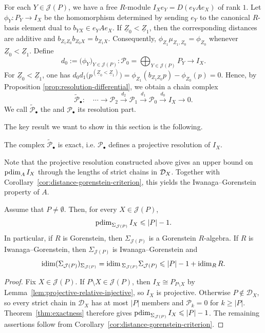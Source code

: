 \documentclass[a4paper,leqno]{amsart}
\begin{document}
For each $Y\in\mathcal J(P)$, we have a free $R$-module $I_Xe_Y=D(e_YAe_X)$ of rank $1$.  Let $\phi_Y\colon P_Y\to I_X$ be the homomorphism determined by sending $e_Y$ to the canonical $R$-basis element dual to $b_{YX}\in e_YAe_X$. If $\underline{Z}_0<\underline{Z}_1$, then the corresponding distances are additive and $b_{Z_1Z_0}b_{Z_0X}=b_{Z_1X}$.  Consequently, $\phi_{Z_1}\mu_{Z_1,Z_0}=\phi_{Z_0}$ whenever $\underline{Z}_0<\underline{Z}_1$. Define
\[
 d_0:=\bigl(\phi_Y\bigr)_{Y\in\mathcal J(P)}\colon\mathcal P_0=\bigoplus_{Y\in\mathcal J(P)}P_Y\longrightarrow I_X.
\]
For \(\underline{Z}_0<\underline{Z}_1\), one has $d_0d_1\bigl(p^{(\underline{Z}_0<\underline{Z}_1)}\bigr)=\phi_{Z_1}(b_{Z_1Z_0}p)-\phi_{Z_0}(p)=0$. Hence, by Proposition \ref{prop:resolution-differential}, we obtain a chain complex
\begin{equation}
 \widetilde{\mathcal{P}}_\bullet: \quad \cdots\longrightarrow\mathcal P_2\xrightarrow{d_2}\mathcal P_1\xrightarrow{d_1}\mathcal P_0\xrightarrow{d_0}I_X\longrightarrow0.
 \label{eq:candidate-complex}
\end{equation}
We call $\widetilde{\mathcal P}_\bullet$ the  and $\mathcal{P}_\bullet$ its resolution part.

The key result we want to show in this section is the following.
\begin{thm}\label{thm:exactness}
The complex $\widetilde{\mathcal{P}}_\bullet$ is exact, i.e. $\mathcal{P}_\bullet$ defines a projective resolution of $I_X$.
\end{thm}

Note that the projective resolution constructed above gives an upper bound on $\operatorname{pdim}_A I_X$ through the lengths of strict chains in $\mathcal D_X$. Together with Corollary~\ref{cor:distance-gorenstein-criterion}, this yields the Iwanaga--Gorenstein property of $A$.

\begin{cor}\label{cor:distributive-ig}
Assume that $P\neq\emptyset$. Then, for every $X\in\mathcal J(P)$,
\[
\operatorname{pdim}_{\Sigma_{\mathcal J(P)}}I_X\leqslant |P|-1.
\]
In particular, if $R$ is Gorenstein, then $\Sigma_{\mathcal J(P)}$ is a Gorenstein $R$-algebra. If $R$ is Iwanaga--Gorenstein, then $\Sigma_{\mathcal J(P)}$ is Iwanaga--Gorenstein and
\[
\operatorname{idim}(\Sigma_{\mathcal J(P)})_{\Sigma_{\mathcal J(P)}}
=\operatorname{idim}{}_{\Sigma_{\mathcal J(P)}}\Sigma_{\mathcal J(P)}
\leqslant |P|-1+\operatorname{idim}_R R.
\]
\end{cor}

\begin{proof}
Fix $X\in\mathcal J(P)$. If $P\setminus X\in\mathcal J(P)$, then $I_X\cong P_{P\setminus X}$ by Lemma~\ref{lem:projective-relative-injective}, so $I_X$ is projective. Otherwise $P\notin\mathcal D_X$, so every strict chain in $\mathcal D_X$ has at most $|P|$ members and $\mathcal P_k=0$ for $k\geq|P|$. Theorem~\ref{thm:exactness} therefore gives $\operatorname{pdim}_{\Sigma_{\mathcal J(P)}}I_X\leqslant|P|-1$. The remaining assertions follow from Corollary~\ref{cor:distance-gorenstein-criterion}.
\end{proof}
\end{document}
